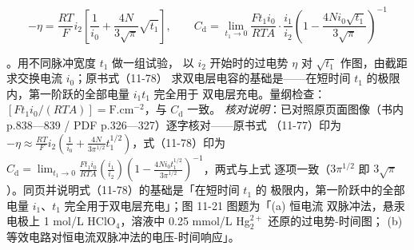 \begin{equation}
-\eta=\frac{RT}{F}i_2\left[\frac{1}{i_0}+\frac{4N}{3\sqrt{\pi}}\sqrt{t_1}\right],
\qquad
C_{\mathrm{d}}=\lim_{t_1\to0}\frac{Ft_1i_0}{RTA}\cdot\frac{i_1}{i_2}
\left(1-\frac{4Ni_0\sqrt{t_1}}{3\sqrt{\pi}}\right)^{-1}
\label{eq:chrono-dp}
\end{equation}

。用不同脉冲宽度 $t_1$ 做一组试验，
以 $i_2$ 开始时的过电势 $\eta$ 对 $\sqrt{t_1}$ 作图，由截距求交换电流 $i_0$；原书式（11-78）
求双电层电容的基础是——在短时间 $t_1$ 的极限内，第一阶跃的全部电量 $i_1t_1$ 完全用于
双电层充电。量纲检查：$[Ft_1i_0/(RTA)]=\mathrm{F.cm^{-2}}$，与 $C_{\mathrm{d}}$ 一致。
\emph{核对说明}：已对照原页面图像（书内 p.838—839 / PDF p.326—327）逐字核对——原书式
（11-77）印为 $-\eta\approx\frac{RT}{F}i_2\left(\frac{1}{i_0}+\frac{4N}{3\pi^{1/2}}
t_1^{1/2}\right)$，式（11-78）印为 $C_{\mathrm{d}}=\lim_{t_1\to0}\frac{Ft_1i_0}{RTA}
\left(\frac{i_1}{i_2}\right)\left(1-\frac{4Ni_0t_1^{1/2}}{3\pi^{1/2}}\right)^{-1}$，两式与上式
逐项一致（$3\pi^{1/2}$ 即 $3\sqrt{\pi}$）。同页并说明式（11-78）的基础是「在短时间 $t_1$ 的
极限内，第一阶跃中的全部电量 $i_1$、$t_1$ 完全用于双电层充电」；图 11-21 图题为「(a) 恒电流
双脉冲法，悬汞电极上 1 mol/L HClO$_4$，溶液中 0.25 mmol/L Hg$_{2}^{2+}$ 还原的过电势-时间图；
(b) 等效电路对恒电流双脉冲法的电压-时间响应」。

